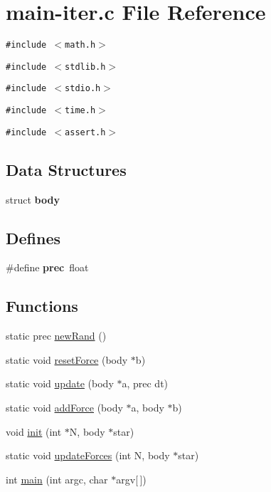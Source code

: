 \hypertarget{main-iter_8c}{
\section{main-iter.c File Reference}
\label{main-iter_8c}
}
{\tt \#include $<$math.h$>$}\par
{\tt \#include $<$stdlib.h$>$}\par
{\tt \#include $<$stdio.h$>$}\par
{\tt \#include $<$time.h$>$}\par
{\tt \#include $<$assert.h$>$}\par
\subsection*{Data Structures}
\begin{CompactItemize}
\item 
struct \textbf{body}
\end{CompactItemize}
\subsection*{Defines}
\begin{CompactItemize}
\item 
\hypertarget{main-iter_8c_4c01dcca324ecd28bf0f7dbd30b6c007}{
\#define \textbf{prec}~float}
\label{main-iter_8c_4c01dcca324ecd28bf0f7dbd30b6c007}

\end{CompactItemize}
\subsection*{Functions}
\begin{CompactItemize}
\item 
static prec \hyperlink{main-iter_8c_656b0e6c956991a96f0f8aa88341f618}{newRand} ()
\item 
static void \hyperlink{main-iter_8c_3c505f52b191ad162e80d25858fdd098}{resetForce} (body $\ast$b)
\item 
static void \hyperlink{main-iter_8c_fc1da57b3f4ebfb1c6f700fe25845bc2}{update} (body $\ast$a, prec dt)
\item 
static void \hyperlink{main-iter_8c_e6e907402026ca4699b0da99978b5be7}{addForce} (body $\ast$a, body $\ast$b)
\item 
void \hyperlink{main-iter_8c_ce5e968cf7efbcb4411b217c194a9646}{init} (int $\ast$N, body $\ast$star)
\item 
static void \hyperlink{main-iter_8c_0225871a22ae8ff450368514791f150e}{updateForces} (int N, body $\ast$star)
\item 
int \hyperlink{main-iter_8c_0ddf1224851353fc92bfbff6f499fa97}{main} (int argc, char $\ast$argv\mbox{[}$\,$\mbox{]})
\end{CompactItemize}

